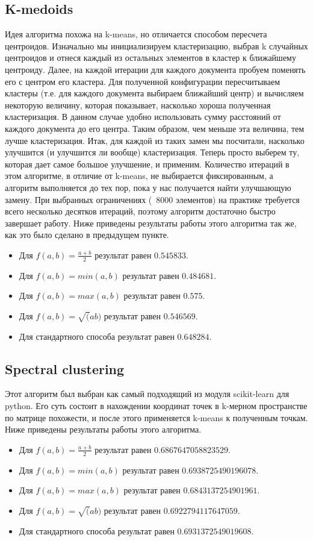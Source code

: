 \subsection{K-medoids}
Идея алгоритма похожа на k-means, но отличается способом пересчета центроидов. Изначально мы инициализируем кластеризацию, выбрав k случайных центроидов и отнеся каждый из остальных элементов в кластер к ближайшему центроиду. Далее, на каждой итерации для каждого документа пробуем поменять его с центром его кластера. Для полученной конфигурации пересчитываем кластеры (т.е. для каждого документа выбираем ближайший центр) и вычисляем некоторую величину, которая показывает, насколько хороша полученная кластеризация. В данном случае удобно использовать сумму расстояний от каждого документа до его центра. Таким образом, чем меньше эта величина, тем лучше кластеризация.
Итак, для каждой из таких замен мы посчитали, насколько улучшится (и улучшится ли вообще) кластеризация. Теперь просто выберем ту, которая дает самое большое улучшение, и применим. \newline
Количество итераций в этом алгоритме, в отличие от k-means, не выбирается фиксированным, а алгоритм выполняется до тех пор, пока у нас получается найти улучшающую замену. При выбранных ограничениях (~8000 элементов) на практике требуется всего несколько десятков итераций, поэтому алгоритм достаточно быстро завершает работу.
Ниже приведены результаты работы этого алгоритма так же, как это было сделано в предыдущем пункте.
\begin{itemize}
\item Для $f(a, b) = \frac{a + b}{2}$ результат равен $0.545833$.
\item Для $f(a, b) = min(a, b)$ результат равен $0.484681$.
\item Для $f(a, b) = max(a, b)$ результат равен $0.575$.
\item Для $f(a, b) = \sqrt(ab)$ результат равен $0.546569$.
\item Для стандартного способа результат равен $0.648284$.
\end{itemize}
\subsection{Spectral clustering}
Этот алгоритм был выбран как самый подходящий из модуля scikit-learn для python. Его суть состоит в нахождении координат точек в k-мерном пространстве по матрице похожести, и после этого применяется k-means к полученным точкам.
Ниже приведены результаты работы этого алгоритма.
\begin{itemize}
\item Для $f(a, b) = \frac{a + b}{2}$ результат равен $0.6867647058823529$.
\item Для $f(a, b) = min(a, b)$ результат равен $0.6938725490196078$.
\item Для $f(a, b) = max(a, b)$ результат равен $0.6843137254901961$.
\item Для $f(a, b) = \sqrt(ab)$ результат равен $0.6922794117647059$.
\item Для стандартного способа результат равен $0.6931372549019608$.
\end{itemize}
